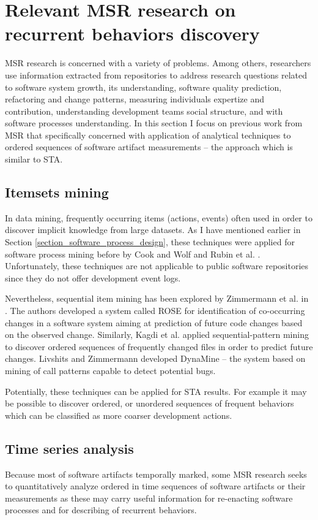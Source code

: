 \section{Relevant MSR research on recurrent behaviors discovery}
MSR research is concerned with a variety of problems. Among others, researchers use information extracted from 
repositories to address research questions related to 
software system growth, 
its understanding,
software quality prediction,
refactoring and change patterns,
measuring individuals expertize and contribution,
understanding development teams social structure,
and with software processes understanding.
In this section I focus on previous work from MSR that specifically concerned with application of analytical techniques 
to ordered sequences of software artifact measurements -- the approach which is similar to STA.

\subsection{Itemsets mining}
In data mining, frequently occurring items (actions, events) often used in order to discover implicit knowledge from
large datasets. As I have mentioned earlier in Section \ref{section_software_process_design}, these techniques were 
applied for software process mining before by Cook and Wolf \cite{citeulike:328044} \cite{citeulike:5120757} 
\cite{citeulike:5128143} and Rubin et al. \cite{citeulike:1885717}. Unfortunately, these techniques are not applicable
to public software repositories since they do not offer development event logs.

Nevertheless, sequential item mining has been explored by Zimmermann et al. in \cite{citeulike:277045}. 
The authors developed a system called ROSE for identification of co-occurring changes in a software system aiming at 
prediction of future code changes based on the observed change. 
Similarly, Kagdi et al. \cite{citeulike:3929070} applied sequential-pattern mining to discover ordered sequences of 
frequently changed files in order to predict future changes. 
Livshits and Zimmermann \cite{citeulike:393158} developed DynaMine -- the system based on mining of call patterns 
capable to detect potential bugs.

Potentially, these techniques can be applied for STA results. For example it may be possible to discover ordered, or
unordered sequences of frequent behaviors which can be classified as more coarser development actions.

\subsection{Time series analysis}\label{chapter2_section-tsanalysis}
Because most of software artifacts temporally marked, some MSR research seeks to quantitatively analyze ordered 
in time sequences of software artifacts or their measurements as these may carry useful information for re-enacting 
software processes and for describing of recurrent behaviors. 

